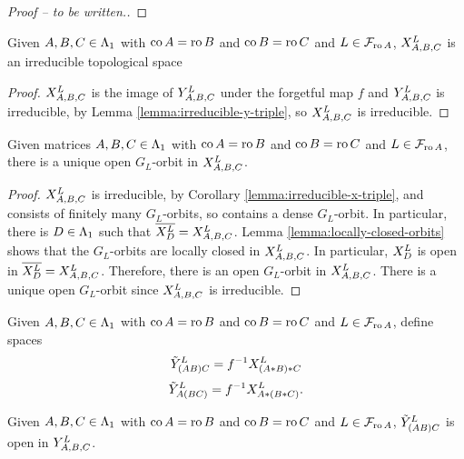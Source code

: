 \documentclass[a4paper, 11pt]{report}
\begin{document}
\begin{proof}[{\color{red}Proof -- to be written.}]
\end{proof}

\begin{corollary}\label{lemma:irreducible-x-triple}
Given $A,B,C\in\matrices$ with $\co{A}=\ro{B}$ and $\co{B}=\ro{C}$ and $L\in\flags_{\ro{A}}$, $\xprod[L]{A,B,C}$ is an irreducible topological space
\end{corollary}

\begin{proof}
$\xprod[L]{A,B,C}$ is the image of $\yprod[L]{A,B,C}$ under the forgetful map $f$ and $\yprod[L]{A,B,C}$ is irreducible, by Lemma \ref{lemma:irreducible-y-triple}, so $\xprod[L]{A,B,C}$ is irreducible.
\end{proof}

\begin{lemma}\label{lemma:generic-triple-product}
Given matrices $A,B,C\in\matrices$ with $\co{A}=\ro{B}$ and $\co{B}=\ro{C}$ and $L\in\flags_{\ro{A}}$, there is a unique open $G_L$-orbit in $\xprod[L]{A,B,C}$.
\end{lemma}

\begin{proof}
$\xprod[L]{A,B,C}$ is irreducible, by Corollary \ref{lemma:irreducible-x-triple}, and consists of finitely many $G_L$-orbits, so contains a dense $G_L$-orbit. In particular, there is $D\in\matrices$ such that $\overline{\xprod[L]{D}}=\xprod[L]{A,B,C}$. Lemma \ref{lemma:locally-closed-orbits} shows that the $G_L$-orbits are locally closed in $\xprod[L]{A,B,C}$. In particular, $\xprod[L]{D}$ is open in $\overline{\xprod[L]{D}} = \xprod[L]{A,B,C}$. Therefore, there is an open $G_L$-orbit in $\xprod[L]{A,B,C}$. There is a unique open $G_L$-orbit since $\xprod[L]{A,B,C}$ is irreducible.
\end{proof}

\begin{definition}
Given $A,B,C\in\matrices$ with $\co{A}=\ro{B}$ and $\co{B}=\ro{C}$ and $L\in\flags_{\ro{A}}$, define spaces
\begin{equation*}
\zprod[L]{(AB)C} = f^{-1}\xprod[L]{(A\ast B)\ast C}
\end{equation*}
\begin{equation*}
\zprod[L]{A(BC)} = f^{-1}\xprod[L]{A\ast(B\ast C)}.
\end{equation*}
\end{definition}

\begin{lemma}\label{lemma:zprod-open-in-yprod-left}
Given $A,B,C\in\matrices$ with $\co{A}=\ro{B}$ and $\co{B}=\ro{C}$ and $L\in\flags_{\ro{A}}$, $\zprod[L]{(AB)C}$ is open in $\yprod[L]{A,B,C}$.
\end{lemma}
\end{document}

